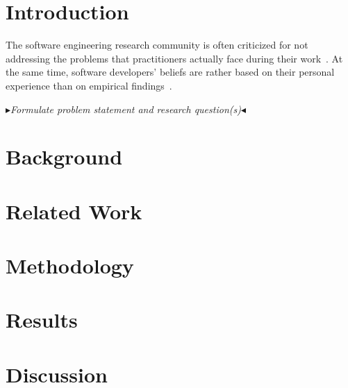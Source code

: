 \documentclass[
	pdftex,
	12pt,
	a4paper,
	parskip=relative,
	twoside,
	footinclude=false,
	footheight=0mm,
	toc=bibliography,
	toc=listof
]{scrbook}
\theoremstyle{definitiontight}
\newcommand{\quotemarks}[1]{{\bfseries{#1}}}
\newenvironment{chapter-quotation}[1]
{\begin{quotation}\pushQED{#1}\noindent\slshape\quotemarks{``}\hspace{-2pt}}
{\hspace{-2pt}\quotemarks{''}\fontsize{10}{10}\normalfont\\{ }\\\hspace*{\fill}---\popQED\end{quotation}}
\newcommand{\boxedtext}[1]{\fbox{\scriptsize\bfseries\textsf{#1}}}
\newcommand{\nota}[2]{
	\boxedtext{#1}
		{\small$\blacktriangleright$\emph{\textsl{#2}}$\blacktriangleleft$}
}
\newcommand{\todo}[1]{{\color{red}\nota{TODO}{#1}}} %
\begin{document}
{\lipsum[1-4]

\tableofcontents

\clearpage

\mainmatter %

\chapter{Introduction}
\label{ch:introduction}



The software engineering research community is often criticized for not addressing the problems that practitioners actually face during their work~\cite{Briand2012}.
At the same time, software developers' beliefs are rather based on their personal experience than on empirical findings~\cite{DevanbuZimmermannOthers2016}.

\todo{Formulate problem statement and research question(s)}

\chapter{Background}
\label{ch:background}

\chapter{Related Work}
\label{ch:related-work}

\chapter{Methodology}
\label{ch:methodology}

\chapter{Results}
\label{ch:results}

\chapter{Discussion}
\label{ch:discussion}

}
\end{document}
